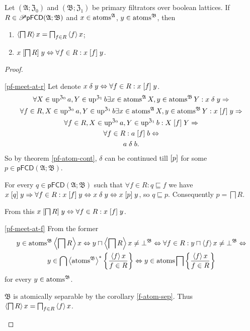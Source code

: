 \begin{thm}
\label{pf-meet-atom}Let $(\mathfrak{A};\mathfrak{Z}_{0})$ and $(\mathfrak{B};\mathfrak{Z}_{1})$
be primary filtrators over boolean lattices. If $R\in\mathscr{P}\mathsf{pFCD}(\mathfrak{A};\mathfrak{B})$
and $x\in\operatorname{atoms}^{\mathfrak{A}}$, $y\in\operatorname{atoms}^{\mathfrak{B}}$, then
\begin{enumerate}
\item \label{pf-meet-at-f}$\left\langle \bigsqcap R\right\rangle x=\bigsqcap_{f\in R}\left\langle f\right\rangle x$;
\item \label{pf-meet-at-r}$x\mathrel{\left[\bigsqcap R\right]}y\Leftrightarrow\forall f\in R:x\mathrel{\left[f\right]}y$.
\end{enumerate}
\end{thm}
\begin{proof}
~
\begin{widedisorder}
\item [{\ref{pf-meet-at-r}}] Let denote $x\mathrel\delta y\Leftrightarrow\forall f\in R:x\mathrel{\left[f\right]}y$.
\begin{gather*}
\forall X\in\operatorname{up}^{\mathfrak{Z}_{0}}a,Y\in\operatorname{up}^{\mathfrak{Z}_{1}}b\exists x\in\operatorname{atoms}^{\mathfrak{A}}X,y\in\operatorname{atoms}^{\mathfrak{B}}Y:x\mathrel\delta y\Rightarrow\\
\forall f\in R,X\in\operatorname{up}^{\mathfrak{Z}_{0}}a,Y\in\operatorname{up}^{\mathfrak{Z}_{1}}b\exists x\in\operatorname{atoms}^{\mathfrak{A}}X,y\in\operatorname{atoms}^{\mathfrak{B}}Y:x\mathrel{\left[f\right]}y\Rightarrow\\
\forall f\in R,X\in\operatorname{up}^{\mathfrak{Z}_{0}}a,Y\in\operatorname{up}^{\mathfrak{Z}_{1}}b:X\mathrel{\left[f\right]}Y\Rightarrow\\
\forall f\in R:a\mathrel{\left[f\right]}b\Leftrightarrow\\
a\mathrel\delta b.
\end{gather*}
So by theorem \ref{pf-atom-cont}, $\delta$ can be continued
till $\mathrel{\left[p\right]}$ for some $p\in\mathsf{pFCD}(\mathfrak{A};\mathfrak{B})$.


For every $q\in\mathsf{pFCD}(\mathfrak{A};\mathfrak{B})$ such that
$\forall f\in R:q\sqsubseteq f$ we have $x\mathrel{\left[q\right]}y\Rightarrow\forall f\in R:x\mathrel{\left[f\right]}y\Leftrightarrow x\mathrel{\delta}y\Leftrightarrow x\mathrel{\left[p\right]}y$,
so $q\sqsubseteq p$. Consequently $p=\bigsqcap R$.


From this $x\mathrel{\left[\bigsqcap R\right]}y\Leftrightarrow\forall f\in R:x\mathrel{\left[f\right]}y$.

\item [{\ref{pf-meet-at-f}}] From the former 
\begin{multline*}
y\in\operatorname{atoms}^{\mathfrak{B}}\left\langle \bigsqcap R\right\rangle x\Leftrightarrow y\sqcap\left\langle \bigsqcap R\right\rangle x\ne\bot^{\mathfrak{B}}\Leftrightarrow\forall f\in R:y\sqcap\left\langle f\right\rangle x\ne\bot^{\mathfrak{B}}\Leftrightarrow\\
y\in\bigcap\left\langle \operatorname{atoms}^{\mathfrak{B}}\right\rangle ^{\ast}\left\{ \frac{\left\langle f\right\rangle x}{f\in R}\right\}\Leftrightarrow y\in\operatorname{atoms}\bigsqcap\left\{ \frac{\left\langle f\right\rangle x}{f\in R}\right\}
\end{multline*}
for every $y\in\operatorname{atoms}^{\mathfrak{B}}$.


$\mathfrak{B}$ is atomically separable by the corollary \ref{f-atom-sep}.
Thus $\left\langle \bigsqcap R\right\rangle x=\bigsqcap_{f\in R}\left\langle f\right\rangle x$.

\end{widedisorder}
\end{proof}

